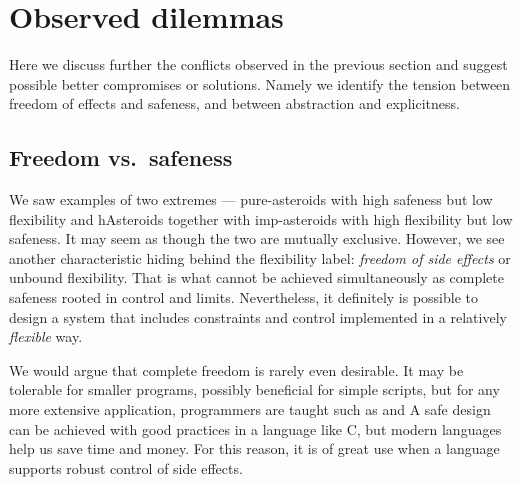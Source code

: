 \documentclass[
  digital, %
  color,   %
  table,   %
  oneside, %
  lof,     %
  lot,     %
]{fithesis3}
\newcommand{\vs}{vs.\ }
\begin{document}
{%







\section{Observed dilemmas}
\label{sect:dilemmas}

Here we discuss further the conflicts observed in the previous section
and suggest possible better compromises or solutions.
Namely we identify the tension between freedom of effects and safeness,
and between abstraction and explicitness.



\subsection{Freedom \vs safeness}
We saw examples of two extremes --- pure-asteroids with high safeness but low flexibility
and hAsteroids together with imp-asteroids with high flexibility but low safeness.
It may seem as though the two are mutually exclusive. However, we see another
characteristic hiding behind the flexibility label: \emph{freedom of side effects}
or unbound flexibility. That is what cannot be achieved
simultaneously as complete safeness rooted in control and limits.
Nevertheless, it definitely is possible to design a system that includes
constraints and control implemented in a relatively \emph{flexible} way.

We would argue that complete freedom is rarely even desirable.
It may be tolerable for smaller programs, possibly beneficial for simple scripts,
but for any more extensive application, programmers are taught  such as
 and 
A safe design can be achieved with good practices in a language like C,
but modern languages help us save time and money.
For this reason, it is of great use when a language supports robust control
of side effects.

}
\end{document}
